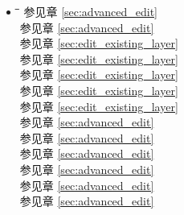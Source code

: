 \begin{itemize}
\item {}
\begin{tabbing}
\hspace{4.5cm}\=\hspace{3cm}\=\hspace{3.5cm}\= \kill
{}
        \> 
        \> 参见章 \ref{sec:advanced_edit}
        \>  \\
        \> 
        \> 参见章 \ref{sec:advanced_edit}
        \>  \\
	\> 
	\> 参见章 \ref{sec:edit_existing_layer}
	\>  \\
	\> 
	\> 参见章 \ref{sec:edit_existing_layer}
	\>  \\
	\> 
	\> 参见章 \ref{sec:edit_existing_layer}
	\>  \\
        \>
        \> 参见章 \ref{sec:edit_existing_layer}
        \>  \\
        \>
        \> 参见章 \ref{sec:edit_existing_layer}
        \>  \\
        \>
        \> 参见章 \ref{sec:advanced_edit}
        \>  \\
        \>
        \> 参见章 \ref{sec:advanced_edit}
        \>  \\
        \>
        \> 参见章 \ref{sec:advanced_edit}
        \>  \\
        \>
        \> 参见章 \ref{sec:advanced_edit}
        \>  \\
        \>
        \> 参见章 \ref{sec:advanced_edit}
        \>  \\
        \>
        \> 参见章 \ref{sec:advanced_edit}
        \>  \\

\end{tabbing}
\end{itemize}

